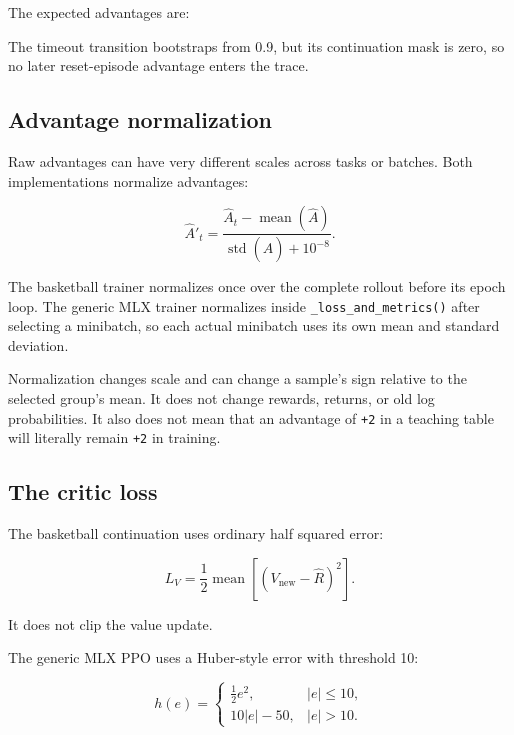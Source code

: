 \documentclass[
  american,
  11pt,
  letterpaper,
]{article}
\newenvironment{Shaded}{\begin{snugshade}}{\end{snugshade}}
\newcommand{\NormalTok}[1]{#1}
\renewenvironment{Shaded}{\par\smallskip}{\par\smallskip}
\begin{document}
The expected advantages are:

\begin{Shaded}
\begin{Highlighting}[]
\NormalTok{[0.586836, {-}0.107565, {-}0.209]}
\end{Highlighting}
\end{Shaded}

The timeout transition bootstraps from 0.9, but its continuation mask is
zero, so no later reset-episode advantage enters the trace.

\subsection{Advantage normalization}\label{advantage-normalization}

Raw advantages can have very different scales across tasks or batches.
Both implementations normalize advantages:

\[
\widehat A'_t
=
\frac{\widehat A_t-\operatorname{mean}(\widehat A)}
{\operatorname{std}(\widehat A)+10^{-8}}.
\]

The basketball trainer normalizes once over the complete rollout before
its epoch loop. The generic MLX trainer normalizes inside
\texttt{\_loss\_and\_metrics()} after selecting a minibatch, so each
actual minibatch uses its own mean and standard deviation.

Normalization changes scale and can change a sample's sign relative to
the selected group's mean. It does not change rewards, returns, or old
log probabilities. It also does not mean that an advantage of
\texttt{+2} in a teaching table will literally remain \texttt{+2} in
training.

\subsection{The critic loss}\label{the-critic-loss}

The basketball continuation uses ordinary half squared error:

\[
L_V
=
\frac12\operatorname{mean}\left[
(V_{\mathrm{new}}-\widehat R)^2
\right].
\]

It does not clip the value update.

The generic MLX PPO uses a Huber-style error with threshold 10:

\[
h(e)=
\begin{cases}
\frac12e^2,&|e|\le10,\\
10|e|-50,&|e|>10.
\end{cases}
\]
\end{document}
